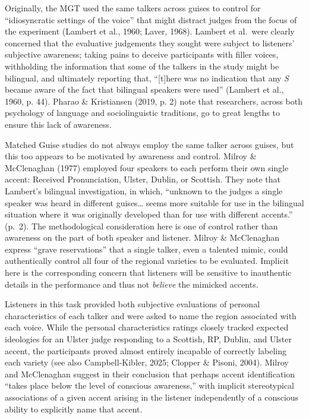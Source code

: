 \documentclass[
  letterpaper,
  DIV=11,
  numbers=noendperiod]{scrartcl}
\begin{document}
Originally, the MGT used the same talkers across guises to control for
``idiosyncratic settings of the voice'' that might distract judges from
the focus of the experiment (Lambert et al., 1960; Laver, 1968). Lambert
et al.~were clearly concerned that the evaluative judgements they sought
were subject to listeners' subjective awareness; taking pains to deceive
participants with filler voices, withholding the information that some
of the talkers in the study might be bilingual, and ultimately reporting
that, ``{[}t{]}here was no indication that any \emph{S} became aware of
the fact that bilingual speakers were used'' (Lambert et al., 1960, p.
44). Pharao \& Kristiansen (2019, p. 2) note that researchers, across
both psychology of language and sociolinguistic traditions, go to great
lengths to ensure this lack of awareness.

Matched Guise studies do not always employ the same talker across
guises, but this too appears to be motivated by awareness and control.
Milroy \& McClenaghan (1977) employed four speakers to each perform
their own single accent: Received Pronunciation, Ulster, Dublin, or
Scottish. They note that Lambert's bilingual investigation, in which,
``unknown to the judges a single speaker was heard in different
guises\ldots{} seems more suitable for use in the bilingual situation
where it was originally developed than for use with different accents.''
(p.~2). The methodological consideration here is one of control rather
than awareness on the part of both speaker and listener. Milroy \&
McClenaghan express ``grave reservations'' that a single talker, even a
talented mimic, could authentically control all four of the regional
varieties to be evaluated. Implicit here is the corresponding concern
that listeners will be sensitive to inauthentic details in the
performance and thus not \emph{believe} the mimicked accents.

Listeners in this task provided both subjective evaluations of personal
characteristics of each talker and were asked to name the region
associated with each voice. While the personal characteristics ratings
closely tracked expected ideologies for an Ulster judge responding to a
Scottish, RP, Dublin, and Ulster accent, the participants proved almost
entirely incapable of correctly labeling each variety (see also
Campbell-Kibler, 2025; Clopper \& Pisoni, 2004). Milroy and McClenaghan
suggest in their conclusion that perhaps accent identification ``takes
place below the level of conscious awareness,'' with implicit
stereotypical associations of a given accent arising in the listener
independently of a conscious ability to explicitly name that accent.
\end{document}
